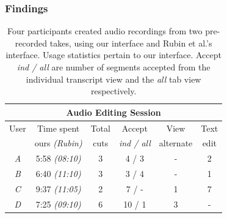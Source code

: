 \subsubsection{Findings}    
\begin{table}[!t]
\center
{}
\begin{tabular}{c|cccccc}
\multicolumn{7}{c}{\textbf{Audio Editing Session}}\\\hline
{User}&\multicolumn{2}{c}{Time spent}& {Total} & {Accept}
&{View}&{Text} \\
{}&\multicolumn{2}{c}{ours \textit{(Rubin)}}&{cuts}&{\textit{ind
/ all}}&{alternate}&{edit}
\\\hline
\textit{A}&\multicolumn{2}{c}{5:58 \textit{(08:10)}}&{3}& {4
/ 3}&{-}&{2}\\
\textit{B}  &\multicolumn{2}{c}{6:40 \textit{(11:10)}}&{3}&{3
/ 4}&{-}&{1}\\
\textit{C}&\multicolumn{2}{c}{9:37 \textit{(11:05)}}&{2}& {7
/ -}&{1}&{7}\\
\textit{D}&\multicolumn{2}{c}{7:25 \textit{(09:10)}}&{6}& {10
/ 1}&{3}&{-}
\\\hline
\end{tabular} 
\label{tab:editing}
\caption{Four participants created audio
recordings from two pre-recorded takes, using our interface and
Rubin et al.'s interface. Usage statistics pertain to our interface.
Accept \textit{ind / all} are number of segments accepted from
the individual transcript view and the \textit{all} tab view
respectively.}
\end{table} 
